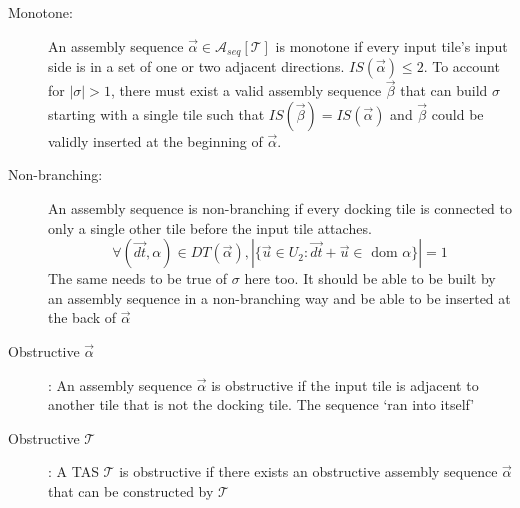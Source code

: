 \documentclass[12pt]{article}
\newcommand{\tSeq}{\mathcal{A}_{seq}[\mathcal{T}]}
\newcommand{\aSeq}{\overrightarrow{\alpha}}
\begin{document}
\begin{description}



    \item[Monotone:] An assembly sequence $\aSeq \in \tSeq$ is monotone if every input tile's input side is in a set of one or two adjacent directions. $IS(\aSeq) \leq 2$. To account for $|\sigma| > 1$, there must exist a valid assembly sequence $\overrightarrow{\beta}$ that can build $\sigma$ starting with a single tile such that $IS(\overrightarrow{\beta}) = IS(\aSeq)$ and $\overrightarrow{\beta}$ could be validly inserted at the beginning of $\aSeq$.

    \item[Non-branching:] An assembly sequence is non-branching if every docking tile is connected to only a single other tile before the input tile attaches.  
        \[ \forall (\vec{dt}, \alpha) \in DT(\aSeq), |\{\vec{u} \in U_2 : \vec{dt} + \vec{u} \in \text { dom } \alpha \} | = 1 \]
    The same needs to be true of $\sigma$ here too. It should be able to be built by an assembly sequence in a non-branching way and be able to be inserted at the back of $\aSeq$


    \item[Obstructive $\aSeq$]: An assembly sequence $\aSeq$ is obstructive if the input tile is adjacent to another tile that is not the docking tile. The sequence `ran into itself'

    \item[Obstructive $\mathcal{T}$]: A TAS $\mathcal{T}$ is obstructive if there exists an obstructive assembly sequence $\aSeq$ that can be constructed by $\mathcal{T}$




\end{description}
\end{document}
